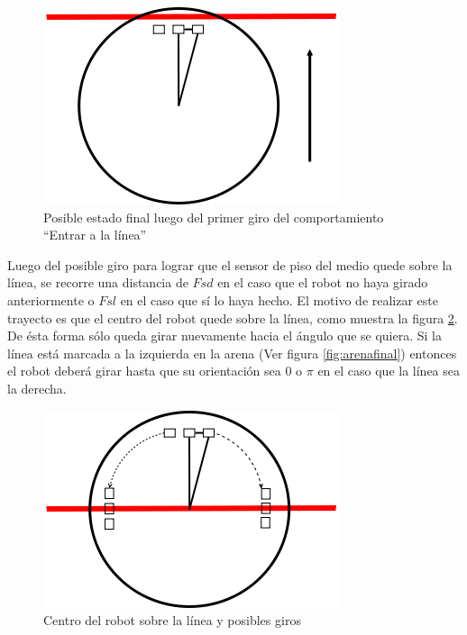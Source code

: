 \begin{figure}[htp]
\begin{center}
\includegraphics[scale=0.4]{comportamientos/figures/floorSensorsLine4.png}
\caption{Posible estado final luego del primer giro del comportamiento
		``Entrar a la l\'inea''}
\label{fig:floorSensorsFinalState}
\end{center}
\end{figure}

Luego del posible giro para lograr que el sensor de piso del medio quede sobre
la l\'inea, se recorre una distancia de $Fsd$ en el caso que el robot no haya
girado anteriormente o $Fsl$ en el caso que s\'i lo haya hecho. El motivo de
realizar este trayecto es que el centro del robot quede sobre la l\'inea, como
muestra la figura \ref{fig:positioned}. De \'esta forma s\'olo queda girar
nuevamente hacia el \'angulo que se quiera. Si la l\'inea est\'a marcada a la
izquierda en la arena (Ver figura \ref{fig:arenafinal}) entonces el robot
deber\'a girar hasta que su orientaci\'on sea $0$ o $\pi$ en el caso que la
l\'inea sea la derecha.

\begin{figure}[htp]
\begin{center}
\includegraphics[scale=0.4]{comportamientos/figures/floorSensorsLine3.png}
\caption{Centro del robot sobre la l\'inea y posibles giros}
\label{fig:positioned}
\end{center}
\end{figure}

